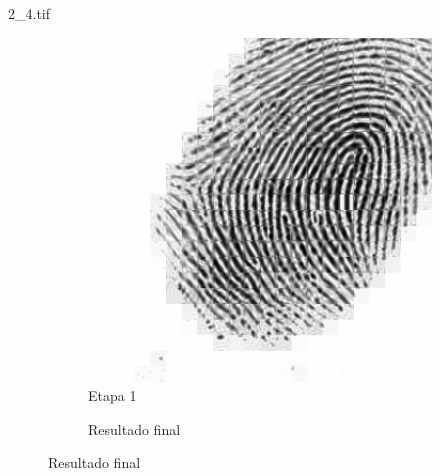 \documentclass{beamer}
\begin{document}
\begin{frame}{2\_4.tif}
\begin{figure}
\begin{subfigure}[!ht]{0.32\textwidth}
                \includegraphics[width=\columnwidth]{Fingerprints/2_4_intermediate.jpg}
                \caption{Etapa 1}
            \end{subfigure}
            \begin{subfigure}[!ht]{0.32\textwidth}
                \caption{Resultado final}
            \end{subfigure}
        \end{figure}
    \end{frame}
\end{document}
